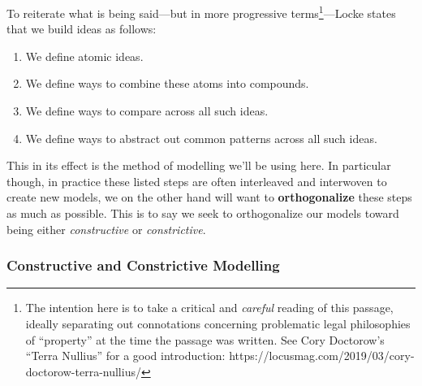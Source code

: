 \documentclass[twoside]{article}
\newcommand{\strong}[1]{{\bfseries #1}}
\begin{document}
To reiterate what is being said---but in more progressive terms\footnote{The intention here is to take a critical
and \emph{careful} reading of this passage, ideally separating out connotations concerning problematic legal philosophies
of ``property'' at the time the passage was written. See Cory Doctorow's ``Terra Nullius'' for a good introduction:
https://locusmag.com/2019/03/cory-doctorow-terra-nullius/}---Locke states that we build ideas as follows:

\begin{enumerate}
\item We define atomic ideas.
\item We define ways to combine these atoms into compounds.
\item We define ways to compare across all such ideas.
\item We define ways to abstract out common patterns across all such ideas.
\end{enumerate}

This in its effect is the method of modelling we'll be using here. In particular though, in practice these listed
steps are often interleaved and interwoven to create new models, we on the other hand will want to \strong{orthogonalize}
these steps as much as possible. This is to say we seek to orthogonalize our models toward being either \emph{constructive}
or \emph{constrictive}.

\subsubsection*{Constructive and Constrictive Modelling}
\end{document}
